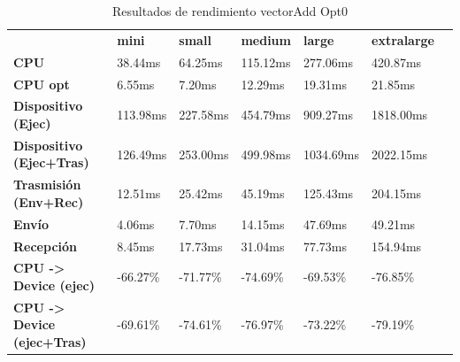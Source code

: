 \begin{table}[H]
    \centering
    \begin{tabular}{lllllll}
    \rowcolor[HTML]{DAE8FC} \ &  \textbf{mini} &  \textbf{small} &  \textbf{medium} &  \textbf{	large} &  \textbf{	extralarge} \\
    \cellcolor[HTML]{DAE8FC} \textbf{CPU} & 38.44ms & 64.25ms & 115.12ms & 	277.06ms & 	420.87ms \\
    \rowcolor[HTML]{EFEFEF} \cellcolor[HTML]{DAE8FC} \textbf{CPU opt} & 6.55ms & 7.20ms & 12.29ms & 	19.31ms & 	21.85ms \\
    \cellcolor[HTML]{DAE8FC} \textbf{Dispositivo (Ejec)} & 113.98ms & 227.58ms & 454.79ms & 	909.27ms & 	1818.00ms \\
    \rowcolor[HTML]{EFEFEF} \cellcolor[HTML]{DAE8FC} \textbf{Dispositivo (Ejec+Tras)} & 126.49ms & 253.00ms & 499.98ms & 	1034.69ms & 	2022.15ms \\
    \cellcolor[HTML]{DAE8FC} \textbf{Trasmisión (Env+Rec)} & 12.51ms & 25.42ms & 45.19ms & 	125.43ms & 	204.15ms \\
    \rowcolor[HTML]{EFEFEF} \cellcolor[HTML]{DAE8FC} \textbf{Envío} & 4.06ms & 7.70ms & 14.15ms & 	47.69ms & 	49.21ms \\
    \cellcolor[HTML]{DAE8FC} \textbf{Recepción} & 8.45ms & 17.73ms & 31.04ms & 	77.73ms & 	154.94ms \\
    \rowcolor[HTML]{EFEFEF} \cellcolor[HTML]{DAE8FC} \textbf{CPU -> Device (ejec)} & -66.27\% & -71.77\% & -74.69\% & 	-69.53\% & 	-76.85\% \\
    \cellcolor[HTML]{DAE8FC} \textbf{CPU -> Device (ejec+Tras)} & -69.61\% & -74.61\% & -76.97\% & 	-73.22\% & 	-79.19\% \\
    \end{tabular}
    \caption[Resultados de rendimiento vectorAdd Opt0]{{Resultados de rendimiento vectorAdd Opt0}}
    \label{table_test_vectorAdd_Opt0_hw_performanceResults}
\end{table}